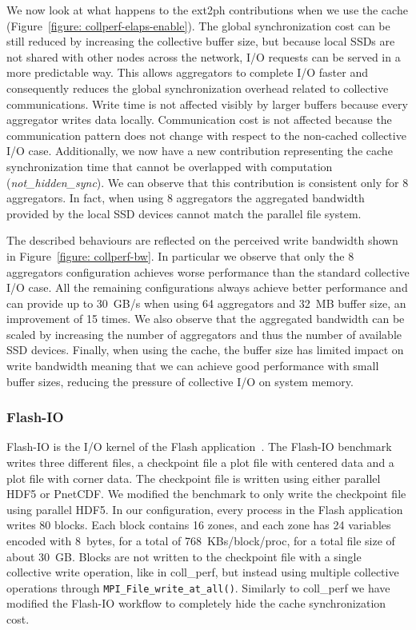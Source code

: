 We now look at what happens to the ext2ph contributions when we use the cache (Figure~\ref{figure: collperf-elaps-enable}). The global synchronization cost can be still reduced
by increasing the collective buffer size, but because local SSDs are not shared with other nodes across the network, I/O requests can be served in a more predictable way. This
allows aggregators to complete I/O faster and consequently reduces the global synchronization overhead related to collective communications. Write time is not affected visibly
by larger buffers because every aggregator writes data locally. Communication cost is not affected because the communication pattern does not change with respect to the non-cached
collective I/O case. Additionally, we now have a new contribution representing the cache synchronization time that cannot be overlapped with computation (\textit{not\_hidden\_sync}).
We can observe that this contribution is consistent only for 8 aggregators. In fact, when using 8 aggregators the aggregated bandwidth provided by the local SSD
devices cannot match the parallel file system.

The described behaviours are reflected on the perceived write bandwidth shown in Figure~\ref{figure: collperf-bw}. In particular we observe that only the 8 aggregators
configuration achieves worse performance than the standard collective I/O case. All the remaining configurations always achieve better performance and can provide up to
30~GB/s when using 64 aggregators and 32~MB buffer size, an improvement of 15 times. We also observe that the aggregated bandwidth can be scaled by increasing the number 
of aggregators and thus the number of available SSD devices. Finally, when using the cache, the buffer size has limited impact on write bandwidth meaning that we can achieve 
good performance with small buffer sizes, reducing the pressure of collective I/O on system memory.

\subsubsection{Flash-IO}
Flash-IO is the I/O kernel of the Flash application~\cite{Rosner2000}. The Flash-IO benchmark writes three different
files, a checkpoint file a plot file with centered data and a plot file with corner data. The checkpoint file is written using either parallel HDF5 or PnetCDF. We modified the
benchmark to only write the checkpoint file using parallel HDF5. In our configuration, every process in the Flash application writes 80 blocks. Each block contains 16 zones, and 
each zone has 24 variables encoded with 8~bytes, for a total of 768~KBs/block/proc, for a total file size of about 30~GB. Blocks are not written to the checkpoint file with a 
single collective write operation, like in coll\_perf, but instead using multiple collective operations through \texttt{MPI\_File\_write\_at\_all()}. Similarly to coll\_perf we 
have modified the Flash-IO workflow to completely hide the cache synchronization cost.

